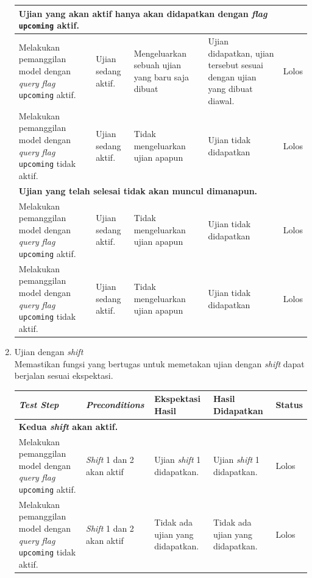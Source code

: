 \begin{enumerate}
\begin{longtable}{|p{}|p{}|p{}|p{}|p{}|}
            \multicolumn{5}{|l|}{\textbf{Ujian yang akan aktif hanya akan didapatkan dengan \textit{flag} \texttt{upcoming} aktif. }}\\
            \hline
            Melakukan pemanggilan model dengan \textit{query} \textit{flag} \texttt{upcoming} aktif. &
            Ujian sedang aktif. & Mengeluarkan sebuah ujian yang baru saja dibuat & 
            Ujian didapatkan, ujian tersebut sesuai dengan ujian yang dibuat diawal. & Lolos \\
            \hline
            Melakukan pemanggilan model dengan \textit{query} \textit{flag} \texttt{upcoming} tidak aktif. &
            Ujian sedang aktif. & Tidak mengeluarkan ujian apapun & Ujian tidak didapatkan & Lolos \\
            \hline
            
             \multicolumn{5}{|l|}{\textbf{Ujian yang telah selesai tidak akan muncul dimanapun.}}\\
            \hline
            Melakukan pemanggilan model dengan \textit{query} \textit{flag} \texttt{upcoming} aktif. &
            Ujian sedang aktif. & Tidak mengeluarkan ujian apapun & Ujian tidak didapatkan & Lolos \\
            \hline
            Melakukan pemanggilan model dengan \textit{query} \textit{flag} \texttt{upcoming} tidak aktif. &
            Ujian sedang aktif. & Tidak mengeluarkan ujian apapun & Ujian tidak didapatkan & Lolos \\
            \hline
        \end{longtable}
    \item Ujian dengan \textit{shift}\\
        Memastikan fungsi yang bertugas untuk memetakan ujian dengan \textit{shift} dapat berjalan sesuai ekspektasi.\\
        
        \begin{longtable}{|p{}|p{}|p{}|p{}|p{}|}
            \hline
            \textit{Test Step} & \textit{Preconditions} & Ekspektasi Hasil & Hasil Didapatkan & Status  \\
            \hline
            \endhead
            
            \multicolumn{5}{|p{0.8\textwidth}|}{\textbf{Kedua \textit{shift} akan aktif.}}\\
            \hline
            Melakukan pemanggilan model dengan \textit{query} \textit{flag} \texttt{upcoming} aktif. &
            \textit{Shift} 1 dan 2 akan aktif & Ujian \textit{shift} 1 didapatkan. & Ujian \textit{shift} 1 didapatkan. & Lolos \\
            \hline
            Melakukan pemanggilan model dengan \textit{query} \textit{flag} \texttt{upcoming} tidak aktif. &
            \textit{Shift} 1 dan 2 akan aktif & Tidak ada ujian yang didapatkan. & Tidak ada ujian yang didapatkan. & Lolos \\
            \hline
            

\end{longtable}
\end{enumerate}
